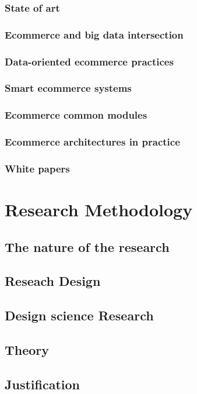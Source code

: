 \documentclass{article}
\begin{document}
\subsubsection{State of art}
\subsubsection{Ecommerce and big data intersection}
\subsubsection{Data-oriented ecommerce practices}
\subsubsection{Smart ecommerce systems}
\subsubsection{Ecommerce common modules}
\subsubsection{Ecommerce architectures in practice}
\subsubsection{White papers}
\hspace{1cm}

\section{Research Methodology}
\subsection{The nature of the research}
\subsection{Reseach Design}
\subsection{Design science Research}
\subsection{Theory}
\subsection{Justification}
\hspace{1cm}
\end{document}
